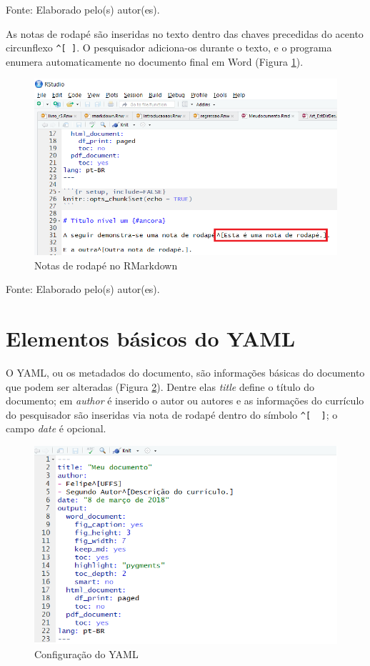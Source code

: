 \documentclass[12pt,brazil,oneside]{book}
\begin{document}
Fonte: Elaborado pelo(s) autor(es).

As notas de rodapé são inseridas no texto dentro das chaves precedidas
do acento circunflexo \texttt{\^{}{[}\ {]}}. O pesquisador adiciona-os
durante o texto, e o programa enumera automaticamente no documento final
em Word (Figura \ref{fig:rmarkrodape}).

\begin{figure}[H]

{\centering \includegraphics[width=0.6\linewidth]{rmarkrodape} 

}

\caption{Notas de rodapé no RMarkdown}\label{fig:rmarkrodape}
\end{figure}

Fonte: Elaborado pelo(s) autor(es).

\hypertarget{elementos-basicos-do-yaml}{%
\section{Elementos básicos do YAML}\label{elementos-basicos-do-yaml}}

O YAML, ou os metadados do documento, são informações básicas do
documento que podem ser alteradas (Figura \ref{fig:rmarkautor}). Dentre
elas \emph{title} define o título do documento; em \emph{author} é
inserido o autor ou autores e as informações do currículo do pesquisador
são inseridas via nota de rodapé dentro do símbolo
\texttt{\^{}{[}\ \ {]}}; o campo \emph{date} é opcional.

\begin{figure}[H]

{\centering \includegraphics[width=0.6\linewidth]{rmarkautor} 

}

\caption{Configuração do YAML}\label{fig:rmarkautor}
\end{figure}
\end{document}
